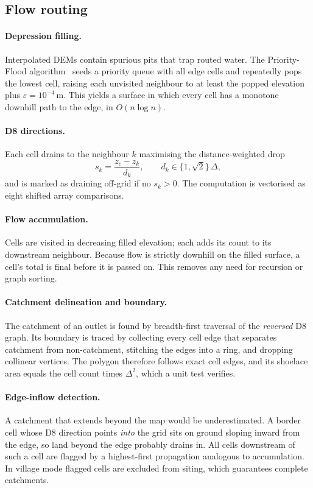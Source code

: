 \documentclass[11pt,a4paper]{article}
\begin{document}
\subsection{Flow routing}
\paragraph{Depression filling.} Interpolated DEMs contain spurious pits that trap routed water.
The Priority-Flood algorithm~\cite{barnes2014} seeds a priority queue with all edge cells and
repeatedly pops the lowest cell, raising each unvisited neighbour to at least the popped
elevation plus $\varepsilon=10^{-4}$\,m. This yields a surface in which every cell has a
monotone downhill path to the edge, in $O(n\log n)$.

\paragraph{D8 directions.} Each cell drains to the neighbour $k$ maximising the distance-weighted
drop~\cite{ocallaghan1984}
\begin{equation}
s_k = \frac{z_c - z_k}{d_k},\qquad d_k\in\{1,\sqrt2\}\,\Delta,
\end{equation}
and is marked as draining off-grid if no $s_k>0$. The computation is vectorised as eight
shifted array comparisons.

\paragraph{Flow accumulation.} Cells are visited in decreasing filled elevation; each adds its
count to its downstream neighbour. Because flow is strictly downhill on the filled surface, a
cell's total is final before it is passed on. This removes any need for recursion or graph
sorting.

\paragraph{Catchment delineation and boundary.} The catchment of an outlet is found by
breadth-first traversal of the \emph{reversed} D8 graph. Its boundary is traced by collecting
every cell edge that separates catchment from non-catchment, stitching the edges into a ring,
and dropping collinear vertices. The polygon therefore follows exact cell edges, and its
shoelace area equals the cell count times $\Delta^2$, which a unit test verifies.

\paragraph{Edge-inflow detection.} A catchment that extends beyond the map would be
underestimated. A border cell whose D8 direction points \emph{into} the grid sits on ground
sloping inward from the edge, so land beyond the edge probably drains in. All cells downstream
of such a cell are flagged by a highest-first propagation analogous to accumulation. In village
mode flagged cells are excluded from siting, which guarantees complete catchments.
\end{document}
